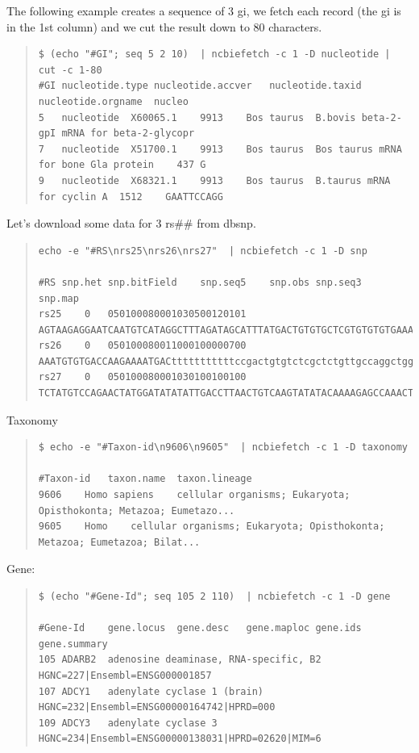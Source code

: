 \documentclass[12pt]{article}
\begin{document}
The following example creates a sequence of 3 gi, we fetch each record (the gi is in the 1st column) and we cut the result down to 80 characters.

\begin{quote}
\begin{verbatim}
$ (echo "#GI"; seq 5 2 10)  | ncbiefetch -c 1 -D nucleotide | cut -c 1-80
#GI	nucleotide.type	nucleotide.accver	nucleotide.taxid	nucleotide.orgname	nucleo
5	nucleotide	X60065.1	9913	Bos taurus	B.bovis beta-2-gpI mRNA for beta-2-glycopr
7	nucleotide	X51700.1	9913	Bos taurus	Bos taurus mRNA for bone Gla protein	437	G
9	nucleotide	X68321.1	9913	Bos taurus	B.taurus mRNA for cyclin A	1512	GAATTCCAGG
\end{verbatim}
\end{quote}

Let's download some data for 3 rs\#\# from dbsnp.
\begin{quote}
\begin{verbatim}
echo -e "#RS\nrs25\nrs26\nrs27"  | ncbiefetch -c 1 -D snp

#RS	snp.het	snp.bitField	snp.seq5	snp.obs	snp.seq3	snp.map
rs25	0	050100080001030500120101	AGTAAGAGGAATCAATGTCATAGGCTTTAGATAGCATTTATGACTGTGTGCTCGTGTGTGTGAAAACT..
rs26	0	050100080011000100000700	AAATGTGTGACCAAGAAAATGACtttttttttttccgactgtgtctcgctctgttgccaggctggagt..
rs27	0	050100080001030100100100	TCTATGTCCAGAACTATGGATATATATTGACCTTAACTGTCAAGTATATACAAAAGAGCCAAACTGCA..
\end{verbatim}
\end{quote}

Taxonomy
\begin{quote}
\begin{verbatim}
$ echo -e "#Taxon-id\n9606\n9605"  | ncbiefetch -c 1 -D taxonomy

#Taxon-id	taxon.name	taxon.lineage
9606	Homo sapiens	cellular organisms; Eukaryota; Opisthokonta; Metazoa; Eumetazo...
9605	Homo	cellular organisms; Eukaryota; Opisthokonta; Metazoa; Eumetazoa; Bilat...
\end{verbatim}
\end{quote}

Gene:
\begin{quote}
\begin{verbatim}
$ (echo "#Gene-Id"; seq 105 2 110)  | ncbiefetch -c 1 -D gene

#Gene-Id	gene.locus	gene.desc	gene.maploc	gene.ids	gene.summary
105	ADARB2	adenosine deaminase, RNA-specific, B2		HGNC=227|Ensembl=ENSG000001857
107	ADCY1	adenylate cyclase 1 (brain)		HGNC=232|Ensembl=ENSG00000164742|HPRD=000
109	ADCY3	adenylate cyclase 3		HGNC=234|Ensembl=ENSG00000138031|HPRD=02620|MIM=6
\end{verbatim}
\end{quote}
\end{document}

